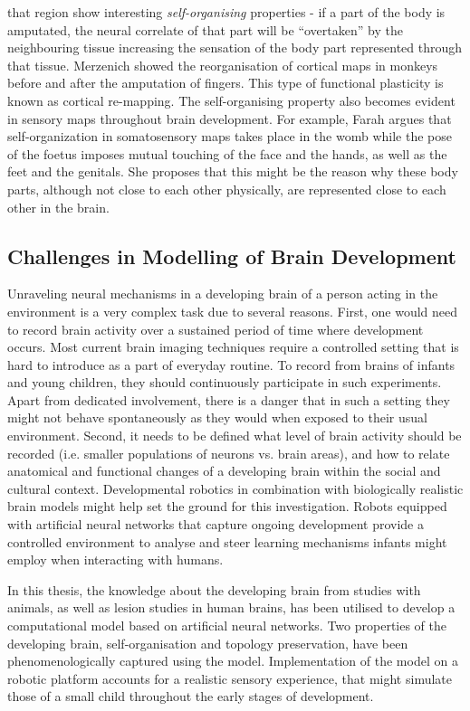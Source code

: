 that region show interesting \emph{self-organising} properties - if a part of 
the 
body is amputated, the neural correlate of that part will be ``overtaken'' by 
the neighbouring tissue increasing the sensation of the body part represented 
through that tissue. Merzenich \citep{merzenich:amputation} showed the 
reorganisation of cortical maps 
in monkeys before and after the amputation of fingers. This type of functional 
plasticity is known as cortical re-mapping.
The self-organising property also becomes evident in sensory maps throughout 
brain development. For example, Farah \citep{Farah98} argues that 
self-organization in somatosensory maps takes place in the womb while the pose 
of the foetus imposes mutual touching of the face and the hands, as well as the 
feet and the genitals. She proposes that this might be the reason why these 
body parts, although not close to each other physically, are represented close 
to each other in the brain. 

\subsection{Challenges in Modelling of Brain Development}
Unraveling neural mechanisms in a developing brain of a person acting in the 
environment is a very complex task due to several reasons. First, one would 
need to record brain activity over a sustained period of time where development 
occurs. Most current brain imaging techniques require a controlled setting that 
is hard to introduce as a part of everyday routine.
To record from brains of infants and young children, they should continuously 
participate in such experiments. Apart from dedicated involvement, there is a 
danger that in such a setting they might not behave spontaneously as they would 
when exposed to their usual environment. Second, it needs to be defined what 
level of brain activity should be recorded (i.e. smaller populations of neurons 
vs. brain areas), and how to relate anatomical and functional changes of a 
developing brain within the social and cultural context. Developmental robotics 
in combination with biologically realistic brain models might help set the 
ground for this investigation. Robots equipped with artificial neural networks 
that capture ongoing development provide a controlled environment 
to analyse and steer learning mechanisms infants might employ when interacting 
with humans. 

In this thesis, the knowledge about the developing brain from studies 
with animals, as well as lesion studies in human brains, has been utilised to 
develop a computational model based on artificial neural networks.
Two properties of the developing brain, self-organisation and topology 
preservation, have been phenomenologically captured using the model.
Implementation of the model on a robotic platform accounts for a realistic 
sensory experience, that might simulate those of a small child throughout the 
early stages of development. 
